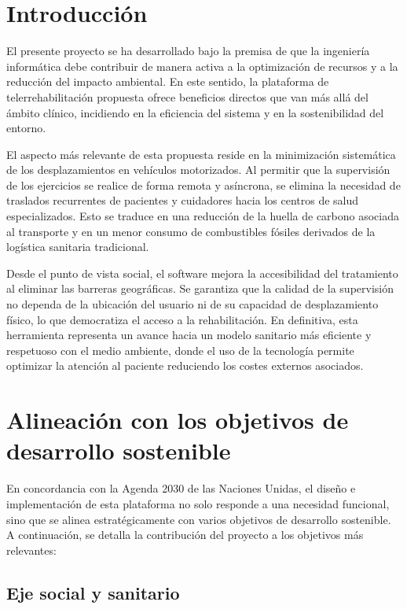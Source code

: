 \label{apendice:F}

\section{Introducción}
El presente proyecto se ha desarrollado bajo la premisa de que la ingeniería informática debe contribuir de manera activa a la optimización de recursos y a la reducción del impacto ambiental. En este sentido, la plataforma de telerrehabilitación propuesta ofrece beneficios directos que van más allá del ámbito clínico, incidiendo en la eficiencia del sistema y en la sostenibilidad del entorno.

El aspecto más relevante de esta propuesta reside en la minimización sistemática de los desplazamientos en vehículos motorizados. Al permitir que la supervisión de los ejercicios se realice de forma remota y asíncrona, se elimina la necesidad de traslados recurrentes de pacientes y cuidadores hacia los centros de salud especializados. Esto se traduce en una reducción de la huella de carbono asociada al transporte y en un menor consumo de combustibles fósiles derivados de la logística sanitaria tradicional.

Desde el punto de vista social, el software mejora la accesibilidad del tratamiento al eliminar las barreras geográficas. Se garantiza que la calidad de la supervisión no dependa de la ubicación del usuario ni de su capacidad de desplazamiento físico, lo que democratiza el acceso a la rehabilitación. En definitiva, esta herramienta representa un avance hacia un modelo sanitario más eficiente y respetuoso con el medio ambiente, donde el uso de la tecnología permite optimizar la atención al paciente reduciendo los costes externos asociados.

\section{Alineación con los objetivos de desarrollo sostenible}

En concordancia con la Agenda 2030 de las Naciones Unidas\cite{un_agenda_2030}, el diseño e implementación de esta plataforma no solo responde a una necesidad funcional, sino que se alinea estratégicamente con varios objetivos de desarrollo sostenible. A continuación, se detalla la contribución del proyecto a los objetivos más relevantes:

\subsection{Eje social y sanitario}

